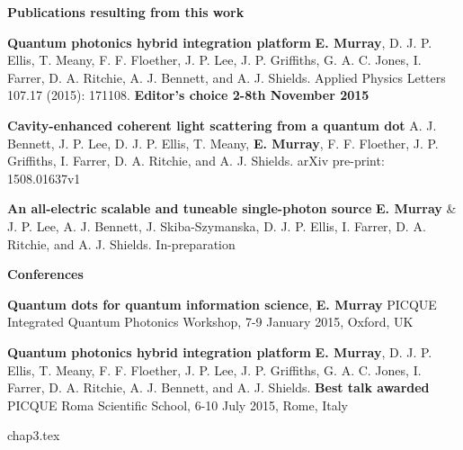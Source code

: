\documentclass[12pt, oneside]{book}
\begin{document}
\newpage \large\textbf{Publications resulting from this work}

\small \textbf{Quantum photonics hybrid integration platform} \newline
\textbf{E. Murray}, D. J. P. Ellis, T. Meany, F. F. Floether, J. P. Lee, J. P.
Griffiths, G. A. C. Jones, I. Farrer, D. A. Ritchie, A. J. Bennett, and A. J.
Shields. \newline Applied Physics Letters 107.17 (2015): 171108. \newline \textbf{Editor's choice 2-8th November 2015}

\small \textbf{Cavity-enhanced coherent light scattering from a quantum dot} A.
J. Bennett, J. P. Lee, D. J. P. Ellis, T. Meany, \textbf{E. Murray}, F. F.
Floether, J. P. Griffiths, I. Farrer, D. A. Ritchie, and A. J. Shields. \newline
arXiv pre-print: 1508.01637v1

\small \textbf{An all-electric scalable and tuneable single-photon source}
\textbf{E. Murray} \& J. P. Lee, A. J. Bennett, J. Skiba-Szymanska, D. J. P. Ellis, I. Farrer, D. A. Ritchie, and A. J. Shields. \newline
In-preparation


\large\textbf{Conferences}

\small \textbf{Quantum dots for quantum information science}, \newline
\textbf{E. Murray} \newline PICQUE Integrated Quantum Photonics Workshop, 7-9
January 2015, Oxford, UK

\small \textbf{Quantum photonics hybrid integration platform} \newline
\textbf{E. Murray}, D. J. P. Ellis, T. Meany, F. F. Floether, J. P. Lee, J. P.
Griffiths, G. A. C. Jones, I. Farrer, D. A. Ritchie, A. J. Bennett, and A. J.
Shields. \newline \textbf{Best talk awarded} PICQUE Roma Scientific School, 6-10
July 2015, Rome, Italy

\newpage \tableofcontents

{chap3.tex}

 {}
\end{document}
